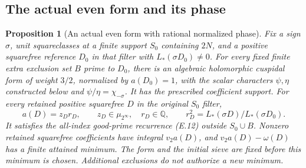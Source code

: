 \documentclass[11pt]{article}
\newtheorem{proposition}[theorem]{Proposition}
\theoremstyle{definition}
\theoremstyle{remark}
\newcommand{\Q}{\mathbb Q}
\begin{document}
\subsection{The actual even form and its phase}
\begin{proposition}[An actual even form with rational normalized phase]\label{ex:app-even-phase}
Fix a sign $\sigma$, unit squareclasses at a finite support $S_0$
containing $2N$, and a positive squarefree reference $D_0$ in that
filter with $L_*(\sigma D_0)\ne0$. For every fixed finite extra
exclusion set $B$ prime to $D_0$, there is an algebraic holomorphic
cuspidal form of weight $3/2$, normalized by $a(D_0)=1$, with the
scalar characters $\psi,\eta$ constructed below and
$\psi/\eta=\chi_{-\sigma}$. It has the prescribed coefficient
support. For every retained positive squarefree $D$ in the original
$S_0$ filter,
\[
 a(D)=z_Dr_D,\qquad z_D\in\mu_{2^\infty},\quad r_D\in\Q,
 \qquad r_D^2=L_*(\sigma D)/L_*(\sigma D_0).
\]
It satisfies the all-index good-prime recurrence (E.12) outside
$S_0\cup B$. Nonzero retained squarefree coefficients have integral
$v_2a(D)$, and $v_2a(D)-\omega(D)$ has a finite attained minimum.
The form and the initial sieve are fixed before this minimum is
chosen. Additional exclusions do not authorize a new minimum.
\end{proposition}
\end{document}
